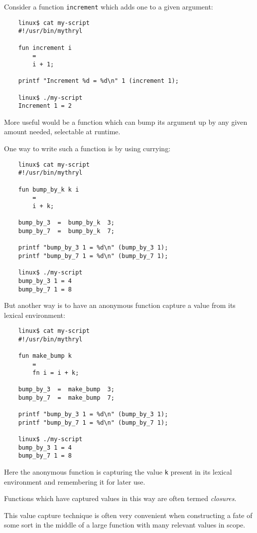 Consider a function {\tt increment} which adds one to a given argument:

\begin{verbatim}
    linux$ cat my-script
    #!/usr/bin/mythryl

    fun increment i
        =
        i + 1;

    printf "Increment %d = %d\n" 1 (increment 1);

    linux$ ./my-script
    Increment 1 = 2
\end{verbatim}

More useful would be a function which can bump its argument up 
by any given amount needed, selectable at runtime.

One way to write such a function is by using currying:

\begin{verbatim}
    linux$ cat my-script
    #!/usr/bin/mythryl

    fun bump_by_k k i
        =
        i + k;

    bump_by_3  =  bump_by_k  3;
    bump_by_7  =  bump_by_k  7;

    printf "bump_by_3 1 = %d\n" (bump_by_3 1);
    printf "bump_by_7 1 = %d\n" (bump_by_7 1);

    linux$ ./my-script
    bump_by_3 1 = 4
    bump_by_7 1 = 8
\end{verbatim}

But another way is to have an anonymous function capture a 
value from its lexical environment:

\begin{verbatim}
    linux$ cat my-script
    #!/usr/bin/mythryl

    fun make_bump k
        =
        fn i = i + k;

    bump_by_3  =  make_bump  3;
    bump_by_7  =  make_bump  7;

    printf "bump_by_3 1 = %d\n" (bump_by_3 1);
    printf "bump_by_7 1 = %d\n" (bump_by_7 1);

    linux$ ./my-script
    bump_by_3 1 = 4
    bump_by_7 1 = 8
\end{verbatim}

Here the anonymous function is capturing the value {\tt k} 
present in its lexical environment and remembering it for 
later use. 

Functions which have captured values in this way are 
often termed {\it closures}.

This value capture technique is often very convenient when 
constructing a fate of some sort in the middle of 
a large function with many relevant values in scope.

